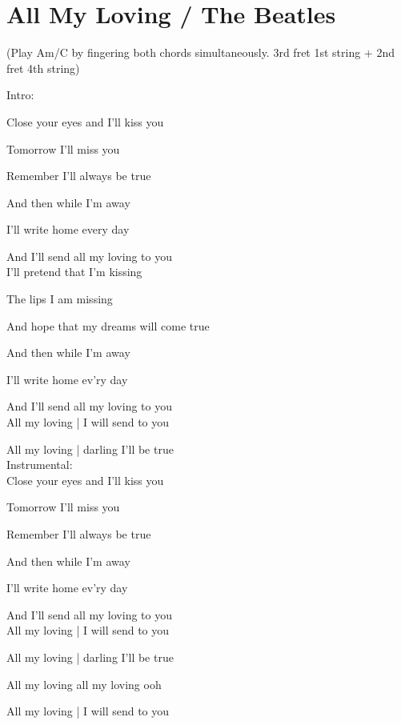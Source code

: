 \section{All My Loving / The Beatles}\label{sec:all_my_loving}
{\small (Play Am/C by fingering both chords simultaneously. 3rd fret 1st string + 2nd fret 4th string)}

\Cmajor
\Gmajor
\Dminor
\Gseven
\Aminor
\Fmajor
\Bflat
\Caugmented

Intro:\hrulefill{}\hrulefill

Close your eyes and I'll kiss you

Tomorrow I'll miss you

Remember I'll always be true 

And then while I'm away

I'll write home every day

And I'll send all my loving to you\\

I'll pretend that I'm kissing

The lips I am missing

And hope that my dreams will come true

And then while I'm away

I'll write home ev'ry day

And I'll send all my loving to you\\

All my loving | I will send to you 

All my loving | darling I'll be true\\

Instrumental: \hrulefill{}\hrulefill{}\hrulefill{}\hrulefill{}\hrulefill\\

Close your eyes and I'll kiss you

Tomorrow I'll miss you

Remember I'll always be true 

And then while I'm away

I'll write home ev'ry day

And I'll send all my loving to you\\


All my loving | I will send to you 

All my loving | darling I'll be true 

All my  loving all my loving ooh

All my loving | I will send to you

